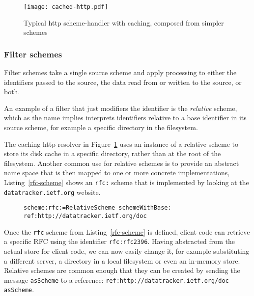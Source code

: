 \documentclass[preprint]{sigplanconf}
\begin{document}
\begin{figure}[htbp]
\centering
\texttt{[image: cached-http.pdf]}
\caption{Typical http scheme-handler with caching, composed from simpler schemes}
\label{fig:http-cached}

\end{figure}


\subsubsection{Filter schemes}
\label{filterschemes}
Filter schemes take a single source scheme and apply processing to either
the identifiers passed to the source,  the data read from or written to the source, or both.

An example of a filter that just modifiers the identifier is the \emph{relative}
scheme, which as the name implies interprets identifiers relative to a base
identifier in its source scheme, for example a specific directory in the
filesystem.  

The caching http resolver in Figure~\ref{fig:http-cached} uses an instance
of a relative scheme to store its disk cache in a specific directory, rather
than at the root of the filesystem.  Another common use for relative schemes
is to provide an abstract name space that is then mapped to one
or more  concrete implementations, Listing~\ref{rfc-scheme} shows
an {\tt rfc:} scheme that is implemented by looking at the {\tt datatracker.ietf.org}
website.


\begin{figure}[htbp]
\begin{lstlisting}[style=numbers,label=rfc-scheme,caption=Defining a custom rfc: scheme.]
scheme:rfc:=RelativeScheme schemeWithBase: ref:http://datatracker.ietf.org/doc
\end{lstlisting}
\end{figure}

Once the {\tt rfc} scheme from Listing~\ref{rfc-scheme} is defined, client code can 
retrieve a specific RFC using the identifier {\tt  rfc:rfc2396}.  Having abstracted
from the actual store for client code, we can now easily change it, for example
substituting a different server, a directory in a local filesystem or even an 
in-memory store.  Relative schemes are common enough that they can be
created by sending the message {\tt asScheme} to a reference: {\tt ref:http://datatracker.ietf.org/doc asScheme}.


\end{document}
